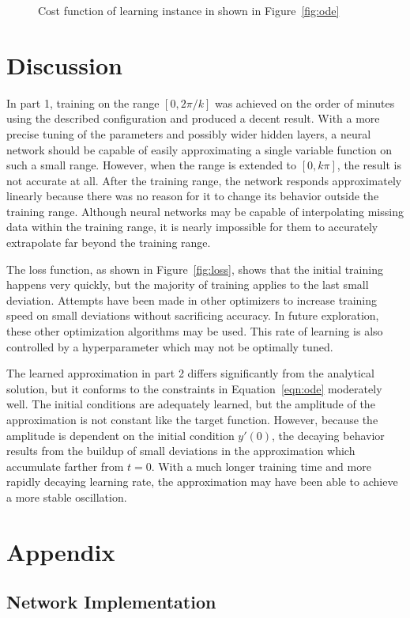 \documentclass{article}
\def\datasecond{2019-04-10-14-19-44}
\begin{document}
        \begin{figure}
            \centering
            \caption{Cost function of learning instance in shown in Figure~\ref{fig:ode}}\label{fig:odeloss}
        \end{figure}

    \section{Discussion}
        In part 1, training on the range $[0,2\pi/k]$ was achieved on the order of minutes using the described configuration and produced a decent result. With a more precise tuning of the parameters and possibly wider hidden layers, a neural network should be capable of easily approximating a single variable function on such a small range. However, when the range is extended to $[0,k\pi]$, the result is not accurate at all. After the training range, the network responds approximately linearly because there was no reason for it to change its behavior outside the training range. Although neural networks may be capable of interpolating missing data within the training range, it is nearly impossible for them to accurately extrapolate far beyond the training range.

        The loss function, as shown in Figure~\ref{fig:loss}, shows that the initial training happens very quickly, but the majority of training applies to the last small deviation. Attempts have been made in other optimizers to increase training speed on small deviations without sacrificing accuracy. In future exploration, these other optimization algorithms may be used. This rate of learning is also controlled by a hyperparameter which may not be optimally tuned.

        The learned approximation in part 2 differs significantly from the analytical solution, but it conforms to the constraints in Equation~\ref{eqn:ode} moderately well. The initial conditions are adequately learned, but the amplitude of the approximation is not constant like the target function. However, because the amplitude is dependent on the initial condition $y'(0)$, the decaying behavior results from the buildup of small deviations in the approximation which accumulate farther from $t=0$. With a much longer training time and more rapidly decaying learning rate, the approximation may have been able to achieve a more stable oscillation.
    \printbibliography{}

    \appendix
    \section{Appendix}
    \setcounter{secnumdepth}{2}
    \renewcommand{\thesubsection}{\Alph{subsection}}
    \subsection{Network Implementation} \label{apx:code}
    
\end{document}
